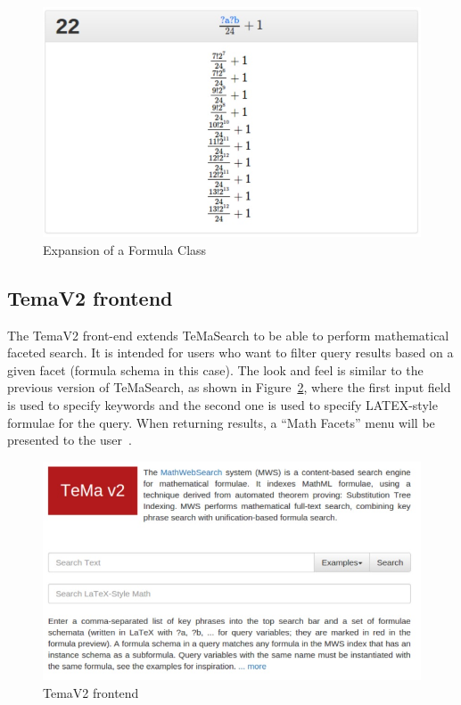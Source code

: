 \documentclass{deliverablereport}
\begin{document}
\begin{figure}[H]
\centering
 \includegraphics[scale=0.8]{figure7.jpg}
 \caption{Expansion of a Formula Class}
 \label{fig:formula_class}
\end{figure}

\subsection{TemaV2 frontend}\label{v2}

The TemaV2 front-end extends TeMaSearch to be able to perform mathematical faceted
search. It is intended for users who want to filter query results based on a given facet
(formula schema in this case). The look and feel is similar to the previous version of
TeMaSearch, as shown in Figure~\ref{fig:temav2}, where the first input field is used to
specify keywords and the second one is used to specify LATEX-style formulae for the
query. When returning results, a “Math Facets” menu will be presented to the
user~\cite{Ham:bcs15}.

\begin{figure}[H]
\centering
 \includegraphics[scale=0.8]{figure8.jpg}
 \caption{TemaV2 frontend}
 \label{fig:temav2}
\end{figure}
\end{document}
